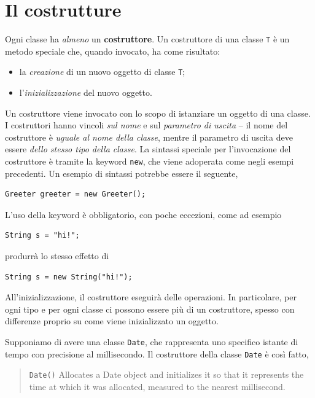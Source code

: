 \documentclass[\fontsizeclass,twocolumn]{\classname}
\theoremstyle{definition}
\theoremstyle{definition}
\begin{document}
\section{Il costrutture}

Ogni classe ha \emph{almeno} un \textbf{costruttore}. Un costruttore di una
classe \texttt{T} è un metodo speciale che, quando invocato, ha come risultato:

\begin{itemize}
	\item la \emph{creazione} di un nuovo oggetto di classe \texttt{T};
	\item l'\emph{inizializzazione} del nuovo oggetto.
\end{itemize}

Un costruttore viene invocato con lo scopo di istanziare un oggetto di una
classe. I costruttori hanno vincoli \emph{sul nome} e sul \emph{parametro di
uscita} \--- il nome del costruttore è \emph{uguale al nome della classe},
mentre il parametro di uscita deve essere \emph{dello stesso tipo della
classe}. La sintassi speciale per l'invocazione del costruttore è tramite la
keyword \texttt{new}, che viene adoperata come negli esempi precedenti. Un
esempio di sintassi potrebbe essere il seguente,

\begin{lstlisting}
Greeter greeter = new Greeter();
\end{lstlisting}

L'uso della keyword è obbligatorio, con poche eccezioni, come ad esempio

\begin{lstlisting}
String s = "hi!";
\end{lstlisting}

produrrà lo stesso effetto di

\begin{lstlisting}
String s = new String("hi!");
\end{lstlisting}

All'inizializzazione, il costruttore eseguirà delle operazioni. In particolare,
per ogni tipo e per ogni classe ci possono essere più di un costruttore, spesso
con differenze proprio su come viene inizializzato un oggetto.

Supponiamo di avere una classe \texttt{Date}, che rappresenta uno specifico
istante di tempo con precisione al millisecondo. Il costruttore della classe
\texttt{Date} è così fatto,


\begin{quote}
    \footnotesize{\texttt{Date()}	Allocates a Date object and initializes it so that it represents the
    time at which it was allocated, measured to the nearest millisecond.}
\end{quote}
\end{document}
